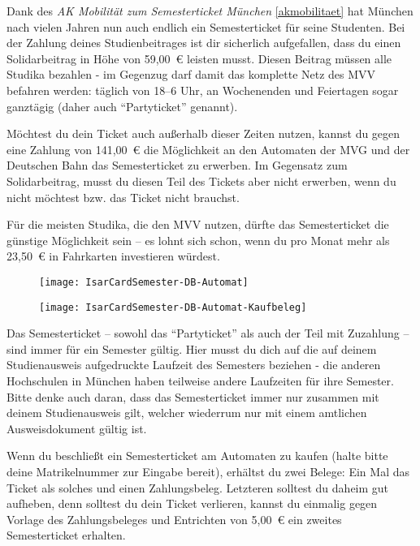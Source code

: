 Dank des \emph{AK Mobilität zum Semesterticket München} \ref{akmobilitaet} hat
München nach vielen Jahren nun auch endlich ein Semesterticket für seine
Studenten. Bei der Zahlung deines Studienbeitrages ist dir sicherlich
aufgefallen, dass du einen Solidarbeitrag in Höhe von 59,00~€ leisten musst.
Diesen Beitrag müssen alle Studika bezahlen - im Gegenzug darf damit das
komplette Netz des MVV befahren werden: täglich von 18--6 Uhr, an Wochenenden
und Feiertagen sogar ganztägig (daher auch ``Partyticket'' genannt).


Möchtest du dein Ticket auch außerhalb dieser Zeiten nutzen, kannst du gegen
eine Zahlung von 141,00~€ die Möglichkeit an den Automaten der MVG und der
Deutschen Bahn das Semesterticket zu erwerben. Im Gegensatz zum Solidarbeitrag,
musst du diesen Teil des Tickets aber nicht erwerben, wenn du nicht möchtest
bzw. das Ticket nicht brauchst.

Für die meisten Studika, die den MVV nutzen, dürfte das Semesterticket die
günstige Möglichkeit sein -- es lohnt sich schon, wenn du pro Monat mehr als
23,50~€ in Fahrkarten investieren würdest.

\begin{figure}[ht]
\centering
	\begin{minipage}[b]{0.45\linewidth}
		\texttt{[image: IsarCardSemester-DB-Automat]}
		\label{fig:isarcardsemesterdb}
	\end{minipage}
	\quad
	\begin{minipage}[b]{0.45\linewidth}
		\texttt{[image: IsarCardSemester-DB-Automat-Kaufbeleg]}
		\label{fig:isarcardsemesterbelegdb}
	\end{minipage}
\end{figure}

Das Semesterticket -- sowohl das ``Partyticket'' als auch der Teil mit
Zuzahlung -- sind immer für ein Semester gültig. Hier musst du dich auf die auf
deinem Studienausweis aufgedruckte Laufzeit des Semesters beziehen - die
anderen Hochschulen in München haben teilweise andere Laufzeiten für ihre
Semester. Bitte denke auch daran, dass das Semesterticket immer nur zusammen
mit deinem Studienausweis gilt, welcher wiederrum nur mit einem amtlichen
Ausweisdokument gültig ist.

Wenn du beschließt ein Semesterticket am Automaten zu kaufen (halte bitte deine
Matrikelnummer zur Eingabe bereit), erhältst du zwei Belege: Ein Mal das Ticket
als solches und einen Zahlungsbeleg. Letzteren solltest du daheim gut aufheben,
denn solltest du dein Ticket verlieren, kannst du einmalig gegen Vorlage des
Zahlungsbeleges und Entrichten von 5,00~€ ein zweites Semesterticket erhalten.

